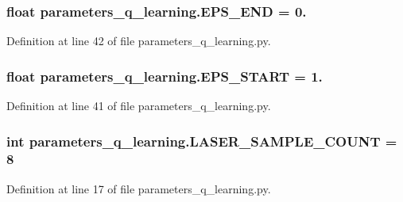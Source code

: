 \subsubsection[{\texorpdfstring{E\+P\+S\+\_\+\+E\+ND}{EPS_END}}]{\setlength{\rightskip}{0pt plus 5cm}float parameters\+\_\+q\+\_\+learning.\+E\+P\+S\+\_\+\+E\+ND = 0.}\hypertarget{namespaceparameters__q__learning_a0d3bb6a1d066977ff1d2df878f18db11}{}\label{namespaceparameters__q__learning_a0d3bb6a1d066977ff1d2df878f18db11}


Definition at line 42 of file parameters\+\_\+q\+\_\+learning.\+py.

\subsubsection[{\texorpdfstring{E\+P\+S\+\_\+\+S\+T\+A\+RT}{EPS_START}}]{\setlength{\rightskip}{0pt plus 5cm}float parameters\+\_\+q\+\_\+learning.\+E\+P\+S\+\_\+\+S\+T\+A\+RT = 1.}\hypertarget{namespaceparameters__q__learning_a21d09414cb2520640df5d394bd9c20d2}{}\label{namespaceparameters__q__learning_a21d09414cb2520640df5d394bd9c20d2}


Definition at line 41 of file parameters\+\_\+q\+\_\+learning.\+py.

\subsubsection[{\texorpdfstring{L\+A\+S\+E\+R\+\_\+\+S\+A\+M\+P\+L\+E\+\_\+\+C\+O\+U\+NT}{LASER_SAMPLE_COUNT}}]{\setlength{\rightskip}{0pt plus 5cm}int parameters\+\_\+q\+\_\+learning.\+L\+A\+S\+E\+R\+\_\+\+S\+A\+M\+P\+L\+E\+\_\+\+C\+O\+U\+NT = 8}\hypertarget{namespaceparameters__q__learning_a4de51256939283562cde82f70bdfa0e9}{}\label{namespaceparameters__q__learning_a4de51256939283562cde82f70bdfa0e9}


Definition at line 17 of file parameters\+\_\+q\+\_\+learning.\+py.

